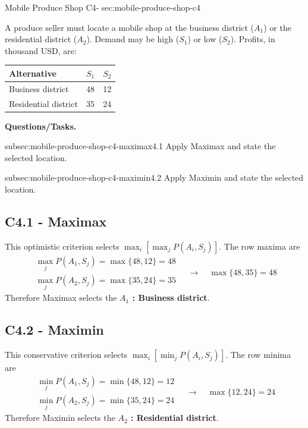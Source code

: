 	\sectionScored
	{Mobile Produce Shop}
	{C4-}
	{sec:mobile-produce-shop-c4}
	{
	A produce seller must locate a mobile shop at the business district ($A_1$) or the residential district ($A_2$). Demand may be high ($S_1$) or low ($S_2$). Profits, in thousand USD, are:
	\begin{center}
	\begin{tabular}{lcc}
	\toprule
	Alternative & $S_1$ & $S_2$ \\
	\midrule
	Business district & 48 & 12 \\
	Residential district & 35 & 24 \\
	\bottomrule
	\end{tabular}
	\end{center}

	\textbf{Questions/Tasks.}
	\begin{enumerate}
		\CriterionTask
		{subsec:mobile-produce-shop-c4-maximax}{4.1}
		{Apply Maximax and state the selected location. }

		\CriterionTask
		{subsec:mobile-produce-shop-c4-maximin}{4.2}
		{Apply Maximin and state the selected location. }
	\end{enumerate}

	\label{subsec:mobile-produce-shop-c4-maximax}
	\subsection*{C4.1 - Maximax }
	
	This optimistic criterion selects
	\(\max_i[\max_j P(A_i,S_j)]\). The row maxima are
	\[ \begin{array}{c}
		\max_jP(A_1,S_j)=\max\{48,12\}=48 \\
		\max_jP(A_2,S_j)=\max\{35,24\}=35
		\end{array}
		\quad \longrightarrow \quad
		\max\{48,35\}=48
	\]
	Therefore Maximax selects the \textbf{\boldmath\(A_1\) : Business district}.

	\vspace{-5mm}
	
	\label{subsec:mobile-produce-shop-c4-maximin}
	\subsection*{C4.2 - Maximin }
	
	This conservative criterion selects
	\(\max_i[\min_j P(A_i,S_j)]\). The row minima are
	\[
	\begin{array}{c}
		\min_jP(A_1,S_j)=\min\{48,12\}=12 \\
		\min_jP(A_2,S_j)=\min\{35,24\}=24
	\end{array}
	\quad \longrightarrow \quad
	\max\{12,24\}=24
	\]
	Therefore Maximin selects the \textbf{\boldmath\(A_2\) : Residential district}.

	\vspace{-5mm}

	}

